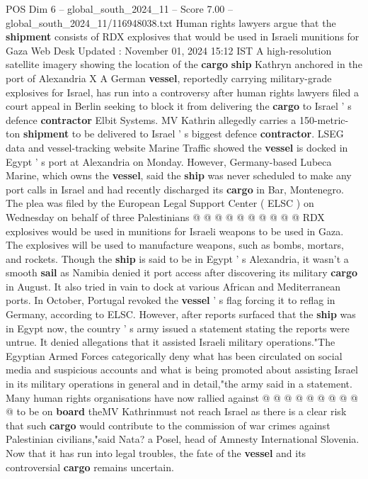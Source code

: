 \begin{textsample}{POS Dim 6 – global\_south\_2024\_11 – Score 7.00 – global\_south\_2024\_11/116948038.txt}  \label{ex:f6_pos_331}
Human rights lawyers argue that the \textbf{shipment} consists of RDX explosives that would be used in Israeli munitions for Gaza Web Desk Updated : November 01, 2024 15:12 IST A high-resolution satellite imagery showing the location of the \textbf{cargo} \textbf{ship} Kathryn anchored in the port of Alexandria X A German \textbf{vessel}, reportedly carrying military-grade explosives for Israel, has run into a controversy after human rights lawyers filed a court appeal in Berlin seeking to block it from delivering the \textbf{cargo} to Israel ' s defence \textbf{contractor} Elbit Systems.
MV Kathrin allegedly carries a 150-metric-ton \textbf{shipment} to be delivered to Israel ' s biggest defence \textbf{contractor}.
LSEG data and vessel-tracking website Marine Traffic showed the \textbf{vessel} is docked in Egypt ' s port at Alexandria on Monday.
However, Germany-based Lubeca Marine, which owns the \textbf{vessel}, said the \textbf{ship} was never scheduled to make any port calls in Israel and had recently discharged its \textbf{cargo} in Bar, Montenegro.
The plea was filed by the European Legal Support Center ( ELSC ) on Wednesday on behalf of three Palestinians @ @ @ @ @ @ @ @ @ @ RDX explosives would be used in munitions for Israeli weapons to be used in Gaza.
The explosives will be used to manufacture weapons, such as bombs, mortars, and rockets.
Though the \textbf{ship} is said to be in Egypt ' s Alexandria, it wasn't a smooth \textbf{sail} as Namibia denied it port access after discovering its military \textbf{cargo} in August.
It also tried in vain to dock at various African and Mediterranean ports.
In October, Portugal revoked the \textbf{vessel} ' s flag forcing it to reflag in Germany, according to ELSC.
However, after reports surfaced that the \textbf{ship} was in Egypt now, the country ' s army issued a statement stating the reports were untrue.
It denied allegations that it assisted Israeli military operations."The Egyptian Armed Forces categorically deny what has been circulated on social media and suspicious accounts and what is being promoted about assisting Israel in its military operations in general and in detail,"the army said in a statement.
Many human rights organisations have now rallied against @ @ @ @ @ @ @ @ @ @ to be on \textbf{board} theMV Kathrinmust not reach Israel as there is a clear risk that such \textbf{cargo} would contribute to the commission of war crimes against Palestinian civilians,"said Nata? a Posel, head of Amnesty International Slovenia.
Now that it has run into legal troubles, the fate of the \textbf{vessel} and its controversial \textbf{cargo} remains uncertain.

\end{textsample}
